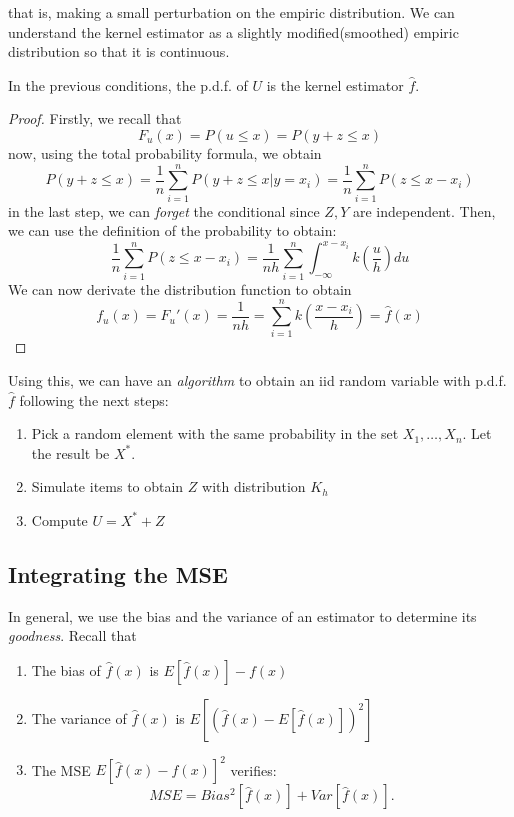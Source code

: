 that is, making a small perturbation on the empiric distribution. We can understand the kernel estimator as a slightly modified(smoothed) empiric distribution so that it is continuous.

\begin{nprop}
In the previous conditions, the p.d.f. of $U$ is the kernel estimator $\hat f$.
\end{nprop}
\begin{proof}
Firstly, we recall that
\[
F_u(x) = P(u \leq x) = P(y+z \leq x)
\]
now, using the total probability formula, we obtain
\[
P(y+z \leq x) = \frac{1}{n}\sum_{i=1}^n P(y+z \leq x | y = x_i) = \frac{1}{n}\sum_{i=1}^n P(z \leq x - x_i)
\]
in the last step, we can \emph{forget} the conditional since $Z,Y$ are independent. Then, we can use the definition of the probability to obtain:
\[
\frac{1}{n}\sum_{i=1}^n P(z \leq x - x_i) = \frac{1}{nh} \sum_{i=1}^n \int_{-\infty}^{x-x_i} k(\frac{u}{h})du
\]
We can now derivate the distribution function to obtain
\[
f_u(x) = F_u'(x) = \frac{1}{nh} = \sum_{i=1}^n k(\frac{x-x_i}{h}) = \hat{f}(x)
\]
\end{proof}

Using this, we can have an \emph{algorithm} to obtain an iid random variable with p.d.f. $\hat f$ following the next steps:
\begin{enumerate}
\item Pick a random element with the same probability in the set $X_1,\dots,X_n$. Let the result be $X^*$.
\item Simulate items to obtain $Z$ with distribution $K_h$
\item Compute $U = X^* +Z$
\end{enumerate}


\subsection{ Integrating the MSE }

In general, we use the bias and the variance of an estimator to determine its \emph{goodness}. Recall that
\begin{enumerate}
\item The bias of $\hat f (x)$ is $E[\hat f (x)] - f(x)$
\item The variance of $\hat f(x)$ is $E[(\hat f(x) - E[\hat f (x)])^2]$
\item The MSE $E[\hat f(x) - f(x)]^2$ verifies:
\[
MSE = Bias^2[\hat f(x)] + Var[\hat f(x)].
\]
\end{enumerate}

